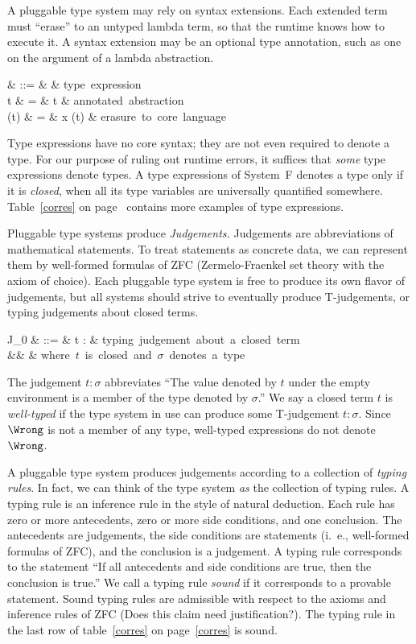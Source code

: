 \documentclass{amsart}
\begin{document}
A pluggable type system may rely on syntax extensions. Each
extended term must ``erase'' to an untyped lambda term, so that
the runtime knows how to execute it. A syntax extension may be an
optional type annotation, such as one on the argument of a lambda
abstraction.
\begin{syntax}
\sigma & ::= & \cdots & \mbox{type expression}\\
t & \+= & t & \mbox{annotated abstraction}\\
\Erase(t) & = & \Abs x \Erase(t) &
\mbox{erasure to core language}
\end{syntax}

Type expressions have no core syntax; they are not even required
to denote a type. For our purpose of ruling out runtime errors,
it suffices that \emph{some} type expressions denote types. A
type expressions of System~F denotes a type only if it is
\emph{closed}, when all its type variables are universally
quantified somewhere. Table~\ref{corres} on page~\pageref{corres}
contains more examples of type expressions.

Pluggable type systems produce \emph{Judgements.} Judgements are
abbreviations of mathematical statements. To treat statements as
concrete data, we can represent them by well-formed formulas of
ZFC (Zermelo-Fraenkel set theory with the axiom of choice). Each
pluggable type system is free to produce its own flavor of
judgements, but all systems should strive to eventually produce
T-judgements, or typing judgements about closed terms.
\begin{syntax}
J_0
& ::=
& t : \sigma
   & \mbox{typing judgement about a closed term} \\
&& & \mbox{where $t$ is closed and $\sigma$ denotes a type}
\end{syntax}%
The judgement $t:\sigma$ abbreviates ``The value denoted by $t$
under the empty environment is a member of the type denoted by
$\sigma$.'' We say a closed term $t$ is \emph{well-typed} if the
type system in use can produce some T-judgement $t:\sigma$.
Since $\Wrong$ is not a member of any type, well-typed
expressions do not denote $\Wrong$.

A pluggable type system produces judgements according to a
collection of \emph{typing rules}. In fact, we can think of the
type system \emph{as} the collection of typing rules. A typing
rule is an inference rule in the style of natural deduction. Each
rule has zero or more antecedents, zero or more side conditions,
and one conclusion. The antecedents are judgements, the side
conditions are statements (i.~e., well-formed formulas of ZFC),
and the conclusion is a judgement. A typing rule corresponds to
the statement ``If all antecedents and side conditions are true,
then the conclusion is true.'' We call a typing rule \emph{sound}
if it corresponds to a provable statement. Sound typing rules are
admissible with respect to the axioms and inference rules of ZFC
(Does this claim need justification?). The typing rule in the
last row of table~\ref{corres} on page~\ref{corres} is sound.
\end{document}
